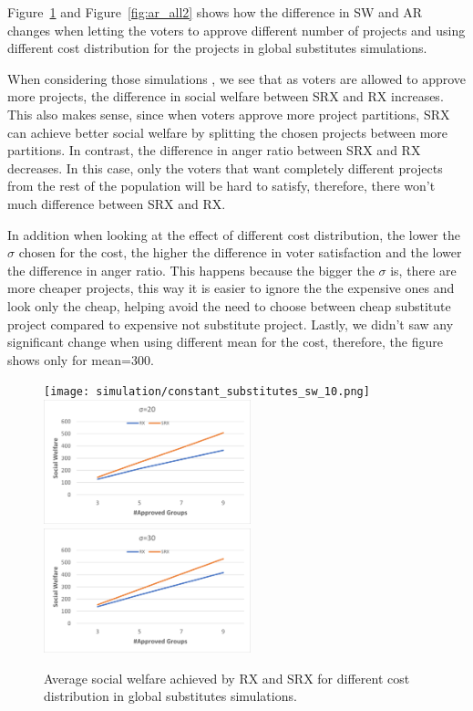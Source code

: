 \documentclass[runningheads]{llncs}
\begin{document}
\begin{subappendices}
Figure~\ref{fig:sw_all2} and Figure~\ref{fig:ar_all2} shows how the difference in SW and AR changes when letting the voters to approve different number of projects and using different cost distribution for the projects in global substitutes simulations.

When considering those   simulations , we   see that as  voters are allowed to approve more projects, the difference in social welfare between SRX and RX increases. This also makes sense, since when voters approve more project partitions, SRX can achieve better social welfare by splitting the chosen projects between more partitions. In contrast, the difference in anger ratio between SRX and RX decreases. In this case, only the voters that want completely different projects from the rest of the population will be hard to satisfy, therefore, there won't much difference between SRX and RX.


In addition when looking at the effect of different cost distribution, the lower the $\sigma$ chosen for the cost, the higher the difference in voter satisfaction and the lower the difference in anger ratio. This happens because the bigger the $\sigma$ is, there are more cheaper projects, this way it is easier to ignore the the expensive ones and look only the cheap, helping avoid the need to choose between cheap substitute project compared to expensive not substitute project. Lastly, we didn't saw any significant change when using different mean for the cost, therefore, the figure shows only for mean=300.

\begin{figure}[t]
\begin{center}
\texttt{[image: simulation/constant\_substitutes\_sw\_10.png]}
\includegraphics[width=6cm]{simulation/constant_substitutes_sw_20.png}
\includegraphics[width=6cm]{simulation/constant_substitutes_sw_30.png}
\caption{Average social welfare achieved by RX and SRX for different cost distribution in global substitutes simulations.
}\label{fig:sw_all2}
\end{center}
\end{figure}



\end{subappendices}
\end{document}
